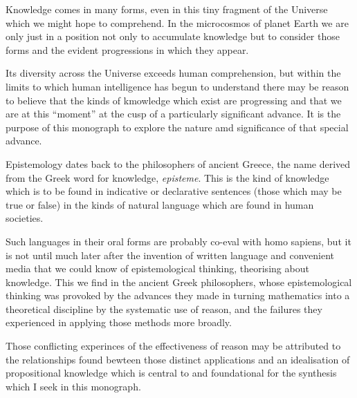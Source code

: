 ﻿
Knowledge comes in many forms, even in this tiny fragment of the Universe which we might hope to comprehend.
In the microcosmos of planet Earth we are only just in a position not only to accumulate knowledge but to consider those forms and the evident progressions in which they appear.


Its diversity across the Universe exceeds human comprehension, but within the limits to which human intelligence has begun to understand there may be reason to believe that the kinds of kmowledge which exist are progressing and that we are at this ``moment'' at the cusp of a particularly significant advance.
It is the purpose of this monograph to explore the nature amd significance of that special advance.


Epistemology dates back to the philosophers of ancient Greece, the name derived from the Greek word for knowledge, \emph{episteme}.
This is the kind of knowledge which is to be found in indicative or declarative sentences (those which may be true or false) in the kinds of natural language which are found in human societies.

Such languages in their oral forms are probably co-eval with homo sapiens, but it is not until much later after the invention of written language and convenient media that we could know of epistemological thinking, theorising about knowledge.
This we find in the ancient Greek philosophers, whose epistemological thinking was provoked by the advances they made in turning mathematics into a theoretical discipline by the systematic use of reason, and the failures they experienced in applying those methods more broadly.

Those conflicting experinces of the effectiveness of reason may be attributed to the relationships found bewteen those distinct applications and an idealisation of propositional knowledge which is central to and foundational for the synthesis which I seek in this monograph.

